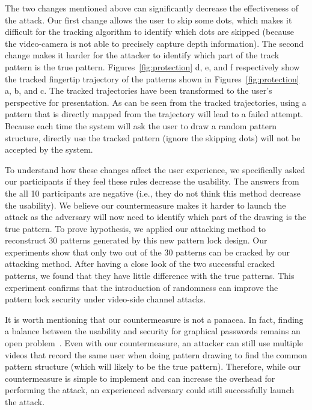 The two changes mentioned above can significantly decrease the effectiveness of the attack.
Our first change allows the user to skip some dots, which makes it difficult for the tracking algorithm to identify which dots
are skipped (because the video-camera is not able to precisely capture depth information). The
second change makes it harder for the attacker to identify which part of the track pattern is the true pattern.
Figures~\ref{fig:protection} d, e, and f respectively show the tracked fingertip trajectory of the
patterns shown in Figures~\ref{fig:protection} a, b, and c. The tracked trajectories have been
transformed to the user's perspective for presentation. As can be seen from the tracked trajectories,
using a pattern that is directly mapped from the trajectory will lead to a failed attempt. Because each time
the system will ask the user to draw a random pattern structure, directly use the tracked pattern (ignore
the skipping dots) will not be accepted by the system.


To understand how these changes affect the user experience, we specifically asked our participants if they feel these rules decrease
the usability. The answers from the all 10 participants are negative (i.e., they do not think this method decrease the usability).
We believe our countermeasure makes it harder to launch the attack as the adversary will now need to
identify which part of the drawing is the true pattern.
To prove hypothesis, we applied our attacking method to reconstruct 30 patterns generated by this new pattern lock design.
Our experiments show that only two out of the 30 patterns can be cracked by our attacking method.
After having a close look of the two successful cracked patterns, we found that they have little difference with the true patterns.
This experiment confirms that the introduction of randomness can improve the pattern lock security under video-side channel attacks.

It is worth mentioning that our countermeasure is not a panacea. In fact, finding a balance between the
usability and security for graphical passwords remains an open problem~\cite{Abdullah2008Towards}.
Even with our countermeasure, an attacker can still use multiple videos that record the same user when doing pattern
drawing to find the common pattern structure (which will likely to be the true pattern). Therefore, while our
countermeasure is simple to implement and can increase the overhead for performing the attack, an experienced
adversary could still successfully launch the attack.


